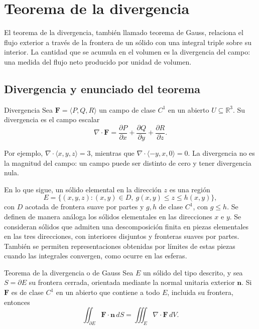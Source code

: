 ﻿\section{Teorema de la divergencia}

El teorema de la divergencia, también llamado teorema de Gauss, relaciona el flujo exterior a través de la frontera de un sólido con una integral triple sobre su interior. La cantidad que se acumula en el volumen es la divergencia del campo: una medida del flujo neto producido por unidad de volumen.

\subsection{Divergencia y enunciado del teorema}

\begin{mydefinition}{Divergencia}
Sea $\mathbf F=\langle P,Q,R\rangle$ un campo de clase $C^1$ en un abierto $U\subseteq\mathbb R^3$. Su divergencia es el campo escalar
\[
\nabla\cdot\mathbf F=\frac{\partial P}{\partial x}
+\frac{\partial Q}{\partial y}+\frac{\partial R}{\partial z}.
\]
\end{mydefinition}

Por ejemplo, $\nabla\cdot\langle x,y,z\rangle=3$, mientras que $\nabla\cdot\langle-y,x,0\rangle=0$. La divergencia no es la magnitud del campo: un campo puede ser distinto de cero y tener divergencia nula.

En lo que sigue, un sólido elemental en la dirección $z$ es una región
\[
E=\{(x,y,z):(x,y)\in D,\ g(x,y)\leq z\leq h(x,y)\},
\]
con $D$ acotada de frontera suave por partes y $g,h$ de clase $C^1$, con $g\leq h$. Se definen de manera análoga los sólidos elementales en las direcciones $x$ e $y$. Se consideran sólidos que admiten una descomposición finita en piezas elementales en las tres direcciones, con interiores disjuntos y fronteras suaves por partes. También se permiten representaciones obtenidas por límites de estas piezas cuando las integrales convergen, como ocurre en las esferas.

\begin{mytheorem}{Teorema de la divergencia o de Gauss}
Sea $E$ un sólido del tipo descrito, y sea $S=\partial E$ su frontera cerrada, orientada mediante la normal unitaria exterior $\mathbf n$. Si $\mathbf F$ es de clase $C^1$ en un abierto que contiene a todo $E$, incluida su frontera, entonces
\[
\iint_{\partial E}\mathbf F\cdot\mathbf n\,dS
=\iiint_E\nabla\cdot\mathbf F\,dV.
\]
\end{mytheorem}

